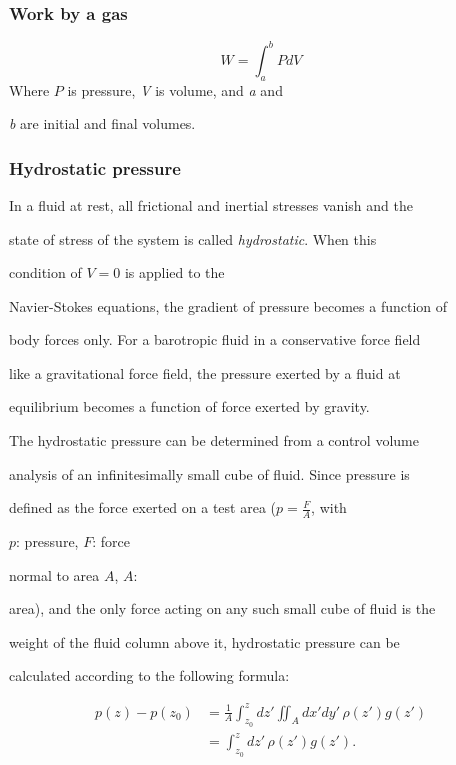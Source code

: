 \subsubsection{Work by a gas}
\label{sss:work-2efb}


\[
W=\int_a^b{P}dV
\] Where $P$ is pressure, \textit{V} is volume, and \textit{a} and

\textit{b} are initial and final volumes.


\subsubsection{Hydrostatic pressure}
\label{sss:hydr-20bf}


In a fluid at rest, all frictional and inertial stresses vanish and the

state of stress of the system is called \textit{hydrostatic}. When this

condition of $V = 0$ is applied to the

Navier-Stokes equations, the gradient of pressure becomes a function of

body forces only. For a barotropic fluid in a conservative force field

like a gravitational force field, the pressure exerted by a fluid at

equilibrium becomes a function of force exerted by gravity.


The hydrostatic pressure can be determined from a control volume

analysis of an infinitesimally small cube of fluid. Since pressure is

defined as the force exerted on a test area ($p = \frac{F}{A}$, with

$p$: pressure, $F$: force

normal to area $A$, $A$:

area), and the only force acting on any such small cube of fluid is the

weight of the fluid column above it, hydrostatic pressure can be

calculated according to the following formula:


\begin{align}
p(z) - p(z_0) &= \frac{1}{A}\int _{z_0}^z dz' \iint_A dx' dy'\, \rho (z') g(z') \\&= \int _{z_0}^z dz'\, \rho (z') g(z').
\end{align}



